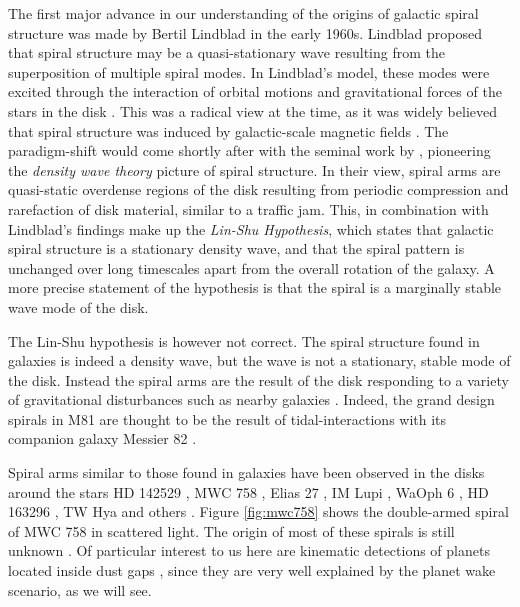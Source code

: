 The first major advance in our understanding of the origins of galactic spiral structure was made by Bertil Lindblad in the early 1960s. 
Lindblad proposed that spiral structure may be a quasi-stationary wave resulting from the superposition of multiple spiral modes.
In Lindblad's model, these modes were excited through the interaction of orbital motions and gravitational forces of the stars in the disk \citep{lindblad1963}.
This was a radical view at the time, as it was widely believed that spiral structure was induced by galactic-scale magnetic fields \citep[eg.][]{hoyle1961,oki1964}.
The paradigm-shift would come shortly after with the seminal work by \citet{lin1964}, pioneering the \textit{density wave theory} picture of spiral structure.
In their view, spiral arms are quasi-static overdense regions of the disk resulting from periodic compression and rarefaction of disk material, similar to a traffic jam.
This, in combination with Lindblad's findings make up the \textit{Lin-Shu Hypothesis}, which states that galactic spiral structure is a stationary density wave, and that the spiral pattern is unchanged over long timescales apart from the overall rotation of the galaxy.
A more precise statement of the hypothesis is that the spiral is a marginally stable wave mode of the disk.

The Lin-Shu hypothesis is however not correct.
The spiral structure found in galaxies is indeed a density wave, but the wave is not a stationary, stable mode of the disk.
Instead the spiral arms are the result of the disk responding to a variety of gravitational disturbances such as nearby galaxies \citep{goldreich1965,julian1966}.
Indeed, the grand design spirals in M81 are thought to be the result of tidal-interactions with its companion galaxy Messier 82 \citep{yun1999a}.

Spiral arms similar to those found in galaxies have been observed in the disks around the stars HD 142529 \citep{christiaens2014}, MWC 758 \citep{benisty2015}, Elias 27 \citep{perez2016,huang2018}, IM Lupi \citep{avenhaus2018,huang2018}, WaOph 6 \citep{huang2018}, HD 163296 \citep{calcino2022}, TW Hya \citep{teague2022} and others \citep[and references therin]{dong2018}.
Figure \ref{fig:mwc758} shows the double-armed spiral of MWC 758 in scattered light.
The origin of most of these spirals is still unknown \citep[eg.][]{zhang2018}.
Of particular interest to us here are kinematic detections of planets located inside dust gaps \citep{pinte2018a,pinte2019,pinte2020,teague2021,teague2022}, since they are very well explained by the planet wake scenario, as we will see.

